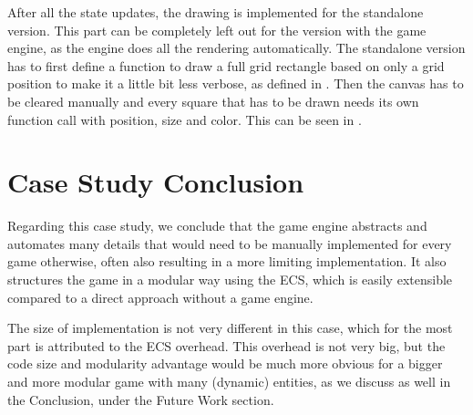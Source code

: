 After all the state updates, the drawing is implemented for the standalone version. This part can be completely left out for the version with the game engine, as the engine does all the rendering automatically. The standalone version has to first define a function to draw a full grid rectangle based on only a grid position to make it a little bit less verbose, as defined in . Then the canvas has to be cleared manually and every square that has to be drawn needs its own function call with position, size and color. This can be seen in .

\section{Case Study Conclusion}

Regarding this case study, we conclude that the game engine abstracts and automates many details that would need to be manually implemented for every game otherwise, often also resulting in a more limiting implementation. It also structures the game in a modular way using the ECS, which is easily extensible compared to a direct approach without a game engine.

The size of implementation is not very different in this case, which for the most part is attributed to the ECS overhead. This overhead is not very big, but the code size and modularity advantage would be much more obvious for a bigger and more modular game with many (dynamic) entities, as we discuss as well in the Conclusion, under the Future Work section.
